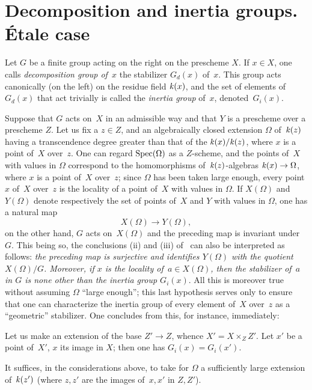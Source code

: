 \section{Decomposition and inertia groups. \'Etale case}
\label{V.2}
Let $G$ be a
finite group acting on the right on the prescheme $X$. If
$x\in X$, one calls
\emph{decomposition group of~$x$}
the stabilizer $G_d(x)$ of~$x$. This group acts canonically
(on the left) on the residue field
$\mathit{k}(x)$, and the set
of elements of~$G_d(x)$ that act trivially is
called the \emph{inertia group}
of~$x$, denoted~$G_i(x)$.

Suppose that $G$ acts on~$X$ in an admissible way and that
$Y$ is a prescheme over a prescheme
$Z$. Let us fix a $z\in Z$, and an algebraically
closed extension $\Omega$
of~$\mathit{k}(z)$ having a transcendence degree
greater than that of the $\mathit{k}(x)/\mathit{k}(z)$, where $x$ is a
point of~$X$ over~$z$. One can regard $\operatorname{Spec}(\Omega)$ as
a $Z$-scheme, and the points of~$X$ with values in $\Omega$
correspond to the homomorphisms
of~$\mathit{k}(z)$-algebras $\kres(x)\to\Omega$,
where $x$ is a point of~$X$ over~$z$;
since $\Omega$ has been taken large enough, every point $x$ of~$X$
over~$z$ is the locality of a point of~$X$ with values
in $\Omega$. If $X(\Omega)$ and $Y(\Omega)$ denote
respectively the set of points of~$X$ and $Y$ with values in
$\Omega$, one has a natural map
$$
X(\Omega)\to Y(\Omega),
$$
on the other hand, $G$ acts on~$X(\Omega)$ and the
preceding map is invariant under $G$. This being so, the
conclusions (ii) and (iii) of~ can also be interpreted
as follows: \emph{the preceding map is surjective and
identifies $Y(\Omega)$ with the quotient $X(\Omega)/G$. Moreover, if $x$ is
the locality of~$a\in X(\Omega)$, then the stabilizer of~$a$
in $G$ is none other than the inertia group $G_i(x)$}. All this is
moreover true without assuming $\Omega$ ``large enough''; this
last hypothesis serves only to ensure that one can
characterize the inertia group of every element of~$X$
over~$z$ as a ``geometric'' stabilizer. One
concludes from this, for instance, immediately:
\begin{proposition}
\label{V.2.1}
Let us make an extension of the base $Z'\to Z$, whence
$X'=X\times_ZZ'$. Let $x'$ be a point of~$X'$, $x$ its image in $X$;
then one has $G_i(x)=G_i(x')$.
\end{proposition}

It suffices, in the considerations above, to take for
$\Omega$ a sufficiently large extension
of~$\mathit{k}(z')$
(where $z,z'$ are the images of~$x,x'$ in $Z,Z'$).

